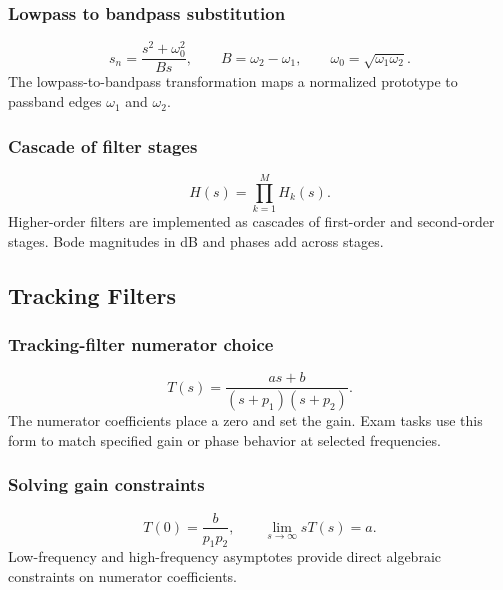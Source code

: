 \subsubsection{Lowpass to bandpass substitution}
\[
s_n=\frac{s^2+\omega_0^2}{B s},
\qquad B=\omega_2-\omega_1,\qquad \omega_0=\sqrt{\omega_1\omega_2}.
\]
The lowpass-to-bandpass transformation maps a normalized prototype to passband edges \(\omega_1\) and \(\omega_2\).

\subsubsection{Cascade of filter stages}
\[
H(s)=\prod_{k=1}^{M}H_k(s).
\]
Higher-order filters are implemented as cascades of first-order and second-order stages. Bode magnitudes in dB and phases add across stages.

\subsection{Tracking Filters}

\subsubsection{Tracking-filter numerator choice}
\[
T(s)=\frac{as+b}{(s+p_1)(s+p_2)}.
\]
The numerator coefficients place a zero and set the gain. Exam tasks use this form to match specified gain or phase behavior at selected frequencies.

\subsubsection{Solving gain constraints}
\[
T(0)=\frac{b}{p_1p_2},\qquad
\lim_{s\to\infty}sT(s)=a.
\]
Low-frequency and high-frequency asymptotes provide direct algebraic constraints on numerator coefficients.
